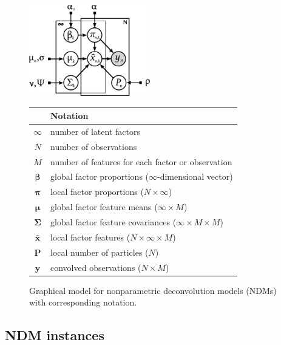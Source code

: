 \documentclass[twoside,11pt]{article}
\begin{document}
\begin{figure}[tb]
    \begin{minipage}[c]{0.45\linewidth}
        \centering
        \includegraphics[height=150px]{graphicalmodel.pdf}
    \end{minipage}
    \hspace{0.5cm}
    \begin{minipage}[t]{0.45\linewidth}
        \footnotesize
        \begin{tabular}{cl}
        \toprule
        & \textbf{Notation} \\
        \midrule
         $\infty$ & number of latent factors \\
         $N$ & number of observations \\
         $M$ & number of features for each factor or observation \\
         $\boldsymbol{\beta}$ & global factor proportions ($\infty$-dimensional vector)\\
         $\boldsymbol{\pi}$ & local factor proportions ($N \times \infty$) \\
         $\boldsymbol{\mu}$ & global factor feature means ($\infty \times M$) \\
         $\boldsymbol{\Sigma}$ & global factor feature covariances ($\infty \times M \times M$) \\
         $\boldsymbol{\bar{x}}$ & local factor features ($N \times \infty \times M$) \\
         $\boldsymbol{P}$ & local number of particles ($N$) \\
         $\boldsymbol{y}$ & convolved observations ($N \times M$) \\
         \bottomrule
        \end{tabular}
    \end{minipage}
   \caption{Graphical model for nonparametric deconvolution models (NDMs) with corresponding notation.}
\label{fig:graphical_model}
\end{figure}

\subsection{NDM instances}
\label{sec:model_instances}
\end{document}
